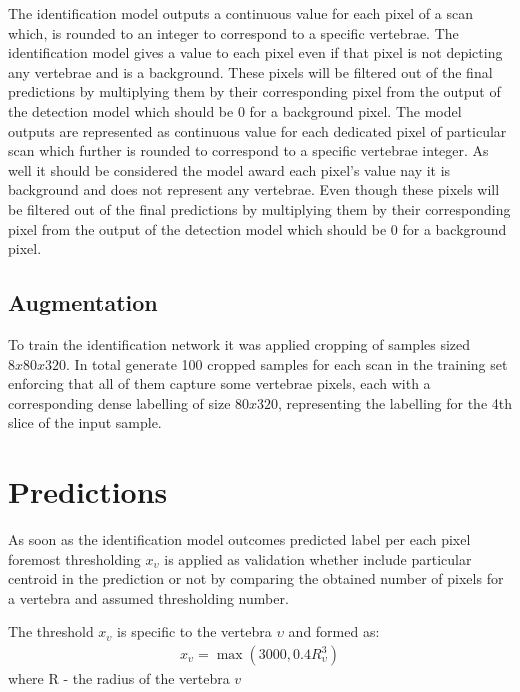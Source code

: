 The identification model outputs a continuous value for each pixel of a scan which, is rounded to an integer to correspond to a specific vertebrae. The identification model gives a value to each pixel even if that pixel is not depicting any vertebrae and is a background. These pixels will be filtered out of the final
predictions by multiplying them by their corresponding pixel from the output of the detection model which should be 0 for a background pixel. The model outputs are represented as continuous value for each dedicated pixel of particular scan which further is rounded to correspond to a specific vertebrae integer. As well it should be considered the model award each pixel's value nay it is background and does not represent any vertebrae. Even though these pixels will be filtered out of the final predictions by multiplying them by their corresponding pixel from the output of the detection model which should be 0 for a background pixel.

\subsection{Augmentation}
To train the identification network it was applied cropping of samples sized $8x80x320$. In total generate 100 cropped samples for each scan in the training set enforcing that all of them capture some vertebrae pixels, each with a corresponding dense labelling of size $80x320$, representing the labelling for the 4th slice of the input sample.

\section{Predictions}
As soon as the identification model outcomes predicted label per each pixel foremost thresholding $x_\upsilon$ is applied as validation whether include particular centroid in the prediction or not by comparing the obtained  number of pixels for a vertebra and assumed thresholding number.

The threshold $x_\upsilon$ is specific to the vertebra $\upsilon$ and formed as:
\begin{align*}
  x_\upsilon = \max(3000, 0.4R_\upsilon^3) 
\end{align*}
where R - the radius of the vertebra $v$
